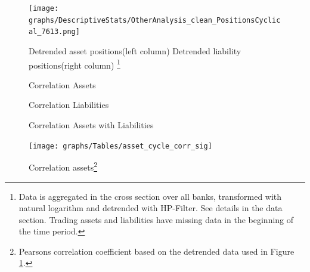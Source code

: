 \documentclass[12pt, a4paper]{article} %
\begin{document}
\begin{figure}[H]
\begin{minipage}{\textwidth}

\centering
\caption[1]{Detrended asset positions(left column) \hspace{2cm} Detrended liability positions(right column) \footnote{Data is aggregated in the cross section over all banks, transformed with natural logarithm and detrended with HP-Filter. See details in the data section. Trading assets and liabilities have missing data in the beginning of the time period.} }
\texttt{[image: graphs/DescriptiveStats/OtherAnalysis\_clean\_PositionsCyclical\_7613.png]}
\label{fig:positions}

\end{minipage}
\end{figure}

\begin{figure}[H]
\begin{minipage}{\textwidth}
\scriptsize
\hskip-2.0cm

\caption[1]{Correlation Assets}
\label{fig:corr_assets}
\end{minipage}
\end{figure}

\begin{figure}[H]
\begin{minipage}{\textwidth}
\scriptsize
\hskip-2.0cm

\caption[1]{Correlation Liabilities}
\label{fig:corr_liab}
\end{minipage}
\end{figure}


\begin{figure}[H]
\begin{minipage}{\textwidth}
\scriptsize
\hskip-2.0cm

\caption[1]{Correlation Assets with Liabilities}
\label{fig:corr_comb}
\end{minipage}
\end{figure}

\iffalse
\begin{figure}[H]
\begin{minipage}{\textwidth}
\centering
\caption[1]{Correlation assets\footnote{Pearsons correlation coefficient based on the detrended data used in Figure \ref{fig:positions}.} }
\texttt{[image: graphs/Tables/asset\_cycle\_corr\_sig]}
\label{fig:corr_assets}
\end{minipage}
\end{figure}
\hskip-2.0cm
\end{document}
